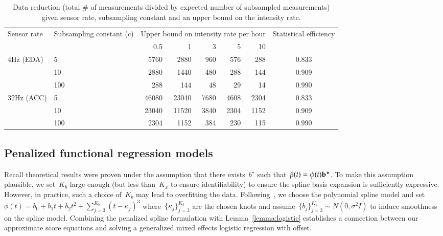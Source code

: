 \documentclass[12pt]{amsart}
\begin{document}
\begin{table}[!th]
\centering
\begin{tabular}{l l r r r r r | c}
\multirow{2}{2.5cm}{Sensor rate} &
\multirow{2}{2.5cm}{Subsampling constant ($c$)}
  & \multicolumn{5}{c}{Upper bound on intensity rate per
    hour}
  & \multirow{2}{2cm}{Statistical efficiency}\\ \cline{3-7}
& & 0.5 & 1 & 3 & 5 & 10 \\ \hline
\multirow{3}{*}{4Hz (EDA)}
& 5 & 5760 & 2880 & 960 & 576 & 288 & 0.833 \\
& 10 & 2880 & 1440 & 480 & 288 & 144 & 0.909 \\
& 100 & 288 & 144 & 48 & 29 & 14 & 0.990 \\ \hline
\multirow{3}{*}{32Hz (ACC)}
& 5 & 46080 & 23040 & 7680 & 4608 & 2304 & 0.833 \\
& 10 & 23040 & 11520 & 3840 & 2304 & 1152 & 0.909 \\
& 100 & 2304 & 1152 & 384 & 230 & 115 & 0.990 \\ \hline
\end{tabular}
\caption{Data reduction (total \# of measurements divided by expected number of subsampled measurements) given sensor rate, subsampling constant and an upper bound on the intensity rate.}
\label{tab:compvseff}
\end{table}

\subsection{Penalized functional regression models}

Recall theoretical results were proven under the assumption that there exists~$b^\star$ such that~$\beta(t) = \phi(t) {\bf b}^\star$. To make this assumption plausible, we set~$K_b$ large enough (but less than~$K_x$ to ensure identifiability) to ensure the spline basis expansion is sufficiently expressive. However, in practice, such a choice of~$K_b$ may lead to overfitting the data. Following~\cite{Goldsmith2011}, we choose the polynomial spline model and set~$\phi(t) = b_0 + b_1 t + b_2 t^2 + \sum_{j=3}^{K_b} (t-\kappa_j)^3$ where~$\{ \kappa_j \}_{j=3}^{K_b}$ are the chosen knots and assume~$\{ b_j \}_{j=3}^{K_b} \sim N(0, \sigma^2 I)$ to induce smoothness on the spline model.  Combining the penalized spline formulation with Lemma~\ref{lemma:logistic} establishes a connection between our approximate score equations and solving a generalized mixed effects logistic regression with offset.
\end{document}
